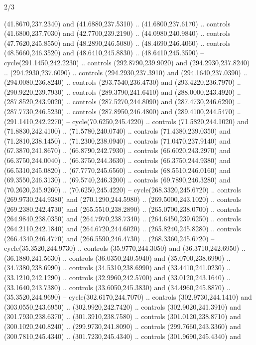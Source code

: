 \begin{flagdescription}{2/3}
\begin{scope}[xshift=0.5\flaglength,yshift=0.5\flagwidth,scale=\stretchfactor]
\begin{scope}[scale=0.001645\flagwidth,yshift=65mm,xshift=-63mm]
\begin{scope}[y=0.80pt, x=0.80pt, yscale=-1,]
\begin{scope}[cm={{1.33333,0.0,0.0,1.33333,(0.0,1e-05)}}]
  (41.8670,237.2340) and (41.6880,237.5310) .. (41.6800,237.6170) .. controls
  (41.6800,237.7030) and (42.7700,239.2190) .. (44.0980,240.9840) .. controls
  (47.7620,245.8550) and (48.2890,246.5080) .. (48.4690,246.4060) .. controls
  (48.5660,246.3520) and (48.6410,245.8830) .. (48.6410,245.3590) --
  cycle(291.1450,242.2230) .. controls (292.8790,239.9020) and
  (294.2930,237.8240) .. (294.2930,237.6090) .. controls (294.2930,237.3910) and
  (294.1640,237.0390) .. (294.0080,236.8240) .. controls (293.7540,236.4730) and
  (293.4220,236.7970) .. (290.9220,239.7930) .. controls (289.3790,241.6410) and
  (288.0000,243.4920) .. (287.8520,243.9020) .. controls (287.5270,244.8090) and
  (287.4730,246.6290) .. (287.7730,246.5230) .. controls (287.8950,246.4800) and
  (289.4100,244.5470) .. (291.1410,242.2270) -- cycle(70.6250,245.4220) ..
  controls (71.5820,244.1020) and (71.8830,242.4100) .. (71.5780,240.0740) ..
  controls (71.4380,239.0350) and (71.2810,238.1450) .. (71.2300,238.0940) ..
  controls (71.0470,237.9140) and (67.3870,241.8670) .. (66.8790,242.7930) ..
  controls (66.6020,243.2970) and (66.3750,244.0040) .. (66.3750,244.3630) ..
  controls (66.3750,244.9380) and (66.5310,245.0820) .. (67.7770,245.6560) ..
  controls (68.5510,246.0160) and (69.3550,246.3130) .. (69.5740,246.3200) ..
  controls (69.7890,246.3280) and (70.2620,245.9260) .. (70.6250,245.4220) --
  cycle(268.3320,245.6720) .. controls (269.9730,244.9380) and
  (270.1290,244.5980) .. (269.5000,243.1020) .. controls (269.2380,242.4730) and
  (265.5510,238.2890) .. (265.0700,238.0700) .. controls (264.9840,238.0350) and
  (264.7970,238.7340) .. (264.6450,239.6250) .. controls (264.2110,242.1840) and
  (264.6720,244.6020) .. (265.8240,245.8280) .. controls (266.4340,246.4770) and
  (266.5590,246.4730) .. (268.3360,245.6720) -- cycle(35.3520,244.9730) ..
  controls (35.9770,244.3050) and (36.3710,242.6950) .. (36.1880,241.5630) ..
  controls (36.0350,240.5940) and (35.0700,238.6990) .. (34.7380,238.6990) ..
  controls (34.5310,238.6990) and (33.4410,241.0230) .. (33.1210,242.1290) ..
  controls (32.9960,242.5700) and (33.0120,243.1640) .. (33.1640,243.7380) ..
  controls (33.6050,245.3830) and (34.4960,245.8870) .. (35.3520,244.9690) --
  cycle(302.6170,244.7070) .. controls (302.9730,244.1410) and
  (303.0550,243.6950) .. (302.9920,242.7420) .. controls (302.9020,241.3910) and
  (301.7930,238.6370) .. (301.3910,238.7580) .. controls (301.0120,238.8710) and
  (300.1020,240.8240) .. (299.9730,241.8090) .. controls (299.7660,243.3360) and
  (300.7810,245.4340) .. (301.7230,245.4340) .. controls (301.9690,245.4340) and

\end{scope}
\end{scope}
\end{scope}
\end{scope}
\end{flagdescription}
